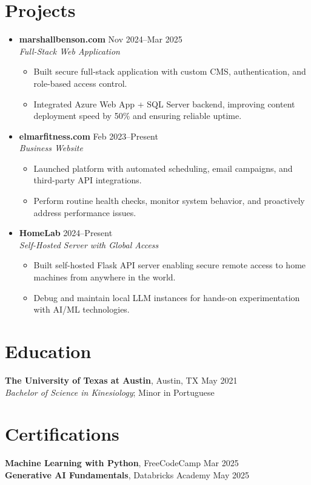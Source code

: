 \documentclass[letterpaper,10pt]{article}
\newcommand{\resumeItem}[1]{\item \small{#1}}
\begin{document}
\section*{Projects}
\begin{itemize}
  \item[]
    \textbf{marshallbenson.com} \hfill Nov 2024--Mar 2025 \\
    \textit{Full-Stack Web Application}
  \begin{itemize}
    \resumeItem{Built secure full-stack application with custom CMS, authentication, and role-based access control.}
    \resumeItem{Integrated Azure Web App + SQL Server backend, improving content deployment speed by 50\% and ensuring reliable uptime.}
  \end{itemize}

  \item[]
    \textbf{elmarfitness.com} \hfill Feb 2023--Present \\
    \textit{Business Website}
  \begin{itemize}
    \resumeItem{Launched platform with automated scheduling, email campaigns, and third-party API integrations.}
    \resumeItem{Perform routine health checks, monitor system behavior, and proactively address performance issues.}
  \end{itemize}

  \item[]
    \textbf{HomeLab} \hfill 2024--Present \\
    \textit{Self-Hosted Server with Global Access}
  \begin{itemize}
    \resumeItem{Built self-hosted Flask API server enabling secure remote access to home machines from anywhere in the world.}
    \resumeItem{Debug and maintain local LLM instances for hands-on experimentation with AI/ML technologies.}
  \end{itemize}
\end{itemize}

\section*{Education}
\textbf{The University of Texas at Austin}, Austin, TX \hfill May 2021 \\
\textit{Bachelor of Science in Kinesiology}; Minor in Portuguese

\section*{Certifications}
\textbf{Machine Learning with Python}, FreeCodeCamp \hfill Mar 2025 \\
\textbf{Generative AI Fundamentals}, Databricks Academy \hfill May 2025
\end{document}
